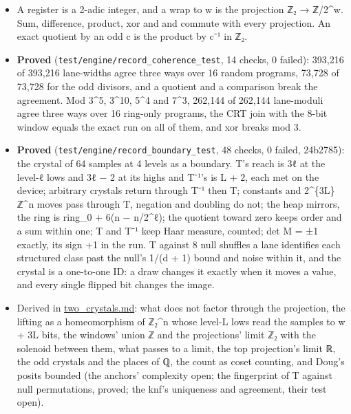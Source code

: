 \begin{itemize}
\begin{itemize}
\item A register is a 2-adic integer, and a wrap to w is the projection ℤ₂ → ℤ/2\textasciicircum{}w. Sum, difference, product, xor and and commute with every projection. An exact quotient by an odd c is the product by c⁻¹ in ℤ₂.
\item \textbf{Proved} (\texttt{test/\allowbreak{}engine/\allowbreak{}record\_\allowbreak{}coherence\_\allowbreak{}test}, 14 checks, 0 failed): 393,216 of 393,216 lane-widths agree three ways over 16 random programs, 73,728 of 73,728 for the odd divisors, and a quotient and a comparison break the agreement. Mod 3\textasciicircum{}5, 3\textasciicircum{}10, 5\textasciicircum{}4 and 7\textasciicircum{}3, 262,144 of 262,144 lane-moduli agree three ways over 16 ring-only programs, the CRT join with the 8-bit window equals the exact run on all of them, and xor breaks mod 3.
\item \textbf{Proved} (\texttt{test/\allowbreak{}engine/\allowbreak{}record\_\allowbreak{}boundary\_\allowbreak{}test}, 48 checks, 0 failed, 24b2785): the crystal of 64 samples at 4 levels as a boundary. T's reach is 3ℓ at the level-ℓ lows and 3ℓ − 2 at its highs and T⁻¹'s is L + 2, each met on the device; arbitrary crystals return through T⁻¹ then T; constants and 2\textasciicircum{}\{3L\}ℤ\textasciicircum{}n moves pass through T, negation and doubling do not; the heap mirrors, the ring is ring\_\allowbreak{}0 + 6(n − n/2\textasciicircum{}ℓ); the quotient toward zero keeps order and a sum within one; T and T⁻¹ keep Haar measure, counted; det M = ±1 exactly, its sign +1 in the run. T against 8 null shuffles a lane identifies each structured class past the null's 1/(d + 1) bound and noise within it, and the crystal is a one-to-one ID: a draw changes it exactly when it moves a value, and every single flipped bit changes the image.
\item Derived in \hyperref[chap:two-crystals]{two\_\allowbreak{}crystals.md}: what does not factor through the projection, the lifting as a homeomorphism of ℤ₂\textasciicircum{}n whose level-L lows read the samples to w + 3L bits, the windows' union ℤ and the projections' limit ℤ₂ with the solenoid between them, what passes to a limit, the top projection's limit ℝ, the odd crystals and the places of ℚ, the count as coset counting, and Doug's posits bounded (the anchors' complexity open; the fingerprint of T against null permutations, proved; the knf's uniqueness and agreement, their test open).

\end{itemize}
\end{itemize}
